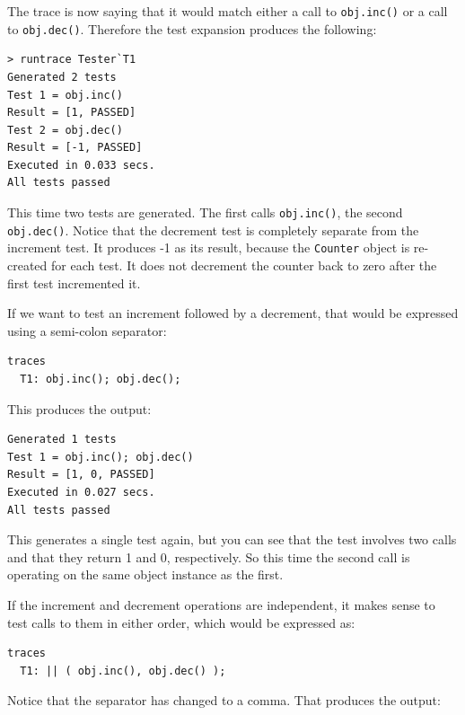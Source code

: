 \documentclass{overturerepchap}
\begin{document}
The trace is now saying that it would match either a call to \texttt{obj.inc()}
or a call to \texttt{obj.dec()}. Therefore the test expansion produces the
following:

\lstset{style=tool,language=}
\begin{lstlisting}[escapechar=@]
> runtrace Tester`T1
Generated 2 tests
Test 1 = obj.inc()
Result = [1, PASSED]
Test 2 = obj.dec()
Result = [-1, PASSED]
Executed in 0.033 secs. 
All tests passed
\end{lstlisting}
\lstset{style=mystyle}
\lstset{language=VDM++}

This time two tests are generated. The first calls \texttt{obj.inc()}, the
second \texttt{obj.dec()}. Notice that the decrement test is completely separate
from the increment test. It produces -1 as its result, because the \texttt{Counter}
object is re-created for each test. It does not decrement the counter back to
zero after the first test incremented it.

If we want to test an increment followed by a decrement, that would be expressed
using a semi-colon separator:

\small
\begin{lstlisting}
traces
  T1: obj.inc(); obj.dec();
\end{lstlisting}
\normalsize

This produces the output:

\small
\lstset{style=tool,language=}
\begin{lstlisting}[escapechar=@]
Generated 1 tests
Test 1 = obj.inc(); obj.dec()
Result = [1, 0, PASSED]
Executed in 0.027 secs. 
All tests passed
\end{lstlisting}
\lstset{style=mystyle}
\lstset{language=VDM++}
\normalsize

This generates a single test again, but you can see that the test involves two
calls and that they return 1 and 0, respectively. So this time the second call
is operating on the same object instance as the first.

If the increment and decrement operations are independent, it makes sense to
test calls to them in either order, which would be expressed as:

\small
\begin{lstlisting}
traces
  T1: || ( obj.inc(), obj.dec() );
\end{lstlisting}
\normalsize

Notice that the separator has changed to a comma. That produces the output:
\end{document}
